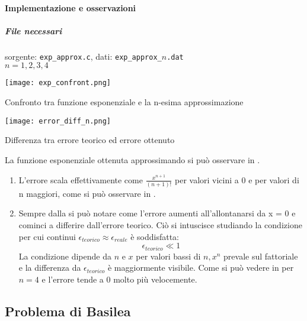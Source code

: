\paragraph{Implementazione e osservazioni}

\subparagraph{File necessari} sorgente: \texttt{exp\_approx.c}, dati: \texttt{exp\_approx\_$n$.dat} \\ $n = 1, 2, 3, 4$

\begin{marginfigure}
	\centering
	\texttt{[image: exp\_confront.png]}
	\caption{Confronto tra funzione esponenziale e la n-esima approssimazione}
\end{marginfigure}


\begin{marginfigure}
	\centering
	\texttt{[image: error\_diff\_n.png]}
	\caption{Differenza tra errore teorico ed errore ottenuto}
\end{marginfigure}

La funzione esponenziale ottenuta approssimando si può osservare in .

\begin{enumerate}
	\item L'errore scala effettivamente come $\frac{x^{n+1}}{(n+1)!}$ per valori
	      vicini a 0 e per valori di n maggiori, come si può osservare in .

	\item Sempre dalla  si può notare come l'errore aumenti all'allontanarsi
	      da x = 0 e cominci a differire dall'errore teorico.
	      Ciò si intuscisce studiando la condizione per cui continui $\epsilon_{teorico} \approx \epsilon_{reale}$ è
	      soddisfatta: $$\epsilon_{teorico} \ll 1$$ La condizione dipende
	      da $n$ e $x$ per valori bassi di $n, x^n$ prevale sul fattoriale e la differenza
	      da $\epsilon_{teorico}$ è maggiormente visibile. Come si può vedere in 
	      per $n = 4$ e l'errore tende a 0 molto più velocemente.

\end{enumerate}


\subsection{Problema di Basilea}

